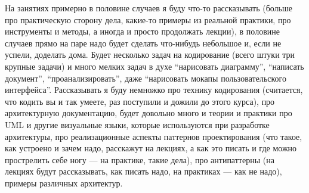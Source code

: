\documentclass[a5paper]{article}
\begin{document}
На занятиях примерно в половине случаев я буду что-то рассказывать (больше про практическую сторону дела, какие-то примеры из реальной практики, про инструменты и методы, а иногда и просто продолжать лекции), в половине случаев прямо на паре надо будет сделать что-нибудь небольшое и, если не успели, доделать дома. Будет несколько задач на кодирование (всего штуки три крупные задачи) и много мелких задач в духе ``нарисовать диаграмму'', ``написать документ'', ``проанализировать'', даже ``нарисовать мокапы пользовательского интерфейса''. Рассказывать я буду немножко про технику кодирования (считается, что кодить вы и так умеете, раз поступили и дожили до этого курса), про архитектурную документацию, будет довольно много и теории и практики про UML и другие визуальные языки, которые используются при разработке архитектуры, про реализационные аспекты паттернов проектирования (что такое, как устроено и зачем надо, расскажут на лекциях, а как это писать и где можно прострелить себе ногу --- на практике, такие дела), про антипаттерны (на лекциях будут рассказывать, как писать надо, на практиках --- как не надо), примеры различных архитектур.
\end{document}
